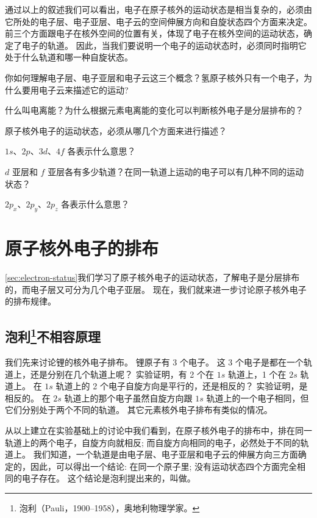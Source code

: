 通过以上的叙述我们可以看出，电子在原子核外的运动状态是相当复杂的，必须由它所处的电子层、电子亚层、电子云的空间伸展方向和自旋状态四个方面来决定。前三个方面跟电子在核外空间的位置有关，体现了电子在核外空间的运动状态，确定了电子的轨道。
因此，当我们要说明一个电子的运动状态时，必须同时指明它处于什么轨道和哪一种自旋状态。

\begin{Practice}[习题]
  \begin{question}
    \item 你如何理解电子层、电子亚层和电子云这三个概念？氢原子核外只有一个电子，为什么要用电子云来描述它的运动?
    \item 什么叫电离能？为什么根据元素电离能的变化可以判断核外电子是分层排布的？
    \item 原子核外电子的运动状态，必须从哪几个方面来进行描述？
    \item $1s$、$2p$、$3d$、$4f$ 各表示什么意思？
    \item $d$ 亚层和 $f$ 亚层各有多少轨道？在同一轨道上运动的电子可以有几种不同的运动状态？
    \item $2p_x$、$2p_y$、$2p_z$ 各表示什么意思？
  \end{question}
\end{Practice}

\section{原子核外电子的排布}
\cref{sec:electron-status}我们学习了原子核外电子的运动状态，了解电子是分层排布的，而电子层又可分为几个电子亚层。
现在，我们就来进一步讨论原子核外电子的排布规律。

\subsection[泡利不相容原理]{泡利\protect\footnote{泡利（Pauli，1900--1958），奥地利物理学家。}不相容原理}
我们先来讨论锂的核外电子排布。
锂原子有 3 个电子。 这 3 个电子是都在一个轨道上，还是分别在几个轨道上呢？
实验证明，有 2 个在 $1s$ 轨道上，1 个在 $2s$ 轨道上。
在 $1s$ 轨道上的 2 个电子自旋方向是平行的，还是相反的？
实验证明，是相反的。
在 $2s$ 轨道上的那个电子虽然自旋方向跟 $1s$ 轨道上的一个电子相同，但它们分别处于两个不同的轨道。
其它元素核外电子排布有类似的情况。

从以上建立在实验基础上的讨论中我们看到，在原子核外电子的排布中，排在同一轨道上的两个电子，自旋方向就相反; 而自旋方向相同的电子，必然处于不同的轨道上。
我们知道，一个轨道是由电子层、电子亚层和电子云的伸展方向三方面确定的，因此，可以得出一个结论: 在同一个原子里; 没有运动状态四个方面完全相同的电子存在。
这个结论是泡利提出来的，叫做。

